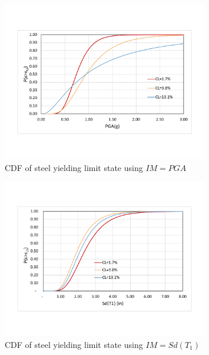 \begin{figure}[htbp]
	\centering
	\includegraphics[width=0.8\textwidth]{Chapter-4/figs/CDF_PGA}
	\caption{CDF of steel yielding limit state using $IM=PGA$}
	\label{fig:CDF_SY_PGA}
\end{figure}
\begin{figure}[htbp]
	\centering
	\includegraphics[width=0.8\textwidth]{Chapter-4/figs/CDF_SdT1}
	\caption{CDF of steel yielding limit state using $IM=Sd(T_1)$}
	\label{fig:CDF_SY_SDT1}
\end{figure}
\newpage
